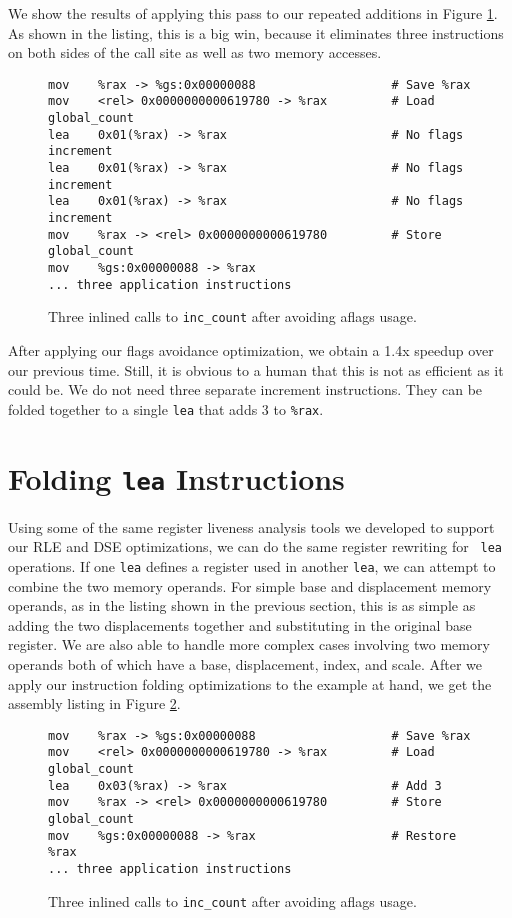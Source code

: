 We show the results of applying this pass to our repeated additions in Figure
\ref{fig:inscount_flags}.  As shown in the listing, this is a big win, because
it eliminates three instructions on both sides of the call site as well as two
memory accesses.

\begin{figure}
\begin{verbatim}
mov    %rax -> %gs:0x00000088                   # Save %rax
mov    <rel> 0x0000000000619780 -> %rax         # Load global_count
lea    0x01(%rax) -> %rax                       # No flags increment
lea    0x01(%rax) -> %rax                       # No flags increment
lea    0x01(%rax) -> %rax                       # No flags increment
mov    %rax -> <rel> 0x0000000000619780         # Store global_count
mov    %gs:0x00000088 -> %rax 
... three application instructions
\end{verbatim}
\caption{Three inlined calls to {\tt inc\_count} after avoiding aflags usage.}
\label{fig:inscount_flags}
\end{figure}

After applying our flags avoidance optimization, we obtain a 1.4x speedup over
our previous time.  Still, it is obvious to a human that this is not as
efficient as it could be.  We do not need three separate increment instructions.
They can be folded together to a single {\tt lea} that adds 3 to {\tt \%rax}.

\section{Folding {\tt lea} Instructions}
\label{sec:fold_lea}

Using some of the same register liveness analysis tools we developed to support
our RLE and DSE optimizations, we can do the same register rewriting for {\tt
lea} operations.  If one {\tt lea} defines a register used in another {\tt lea},
we can attempt to combine the two memory operands.  For simple base and
displacement memory operands, as in the listing shown in the previous section,
this is as simple as adding the two displacements together and substituting in
the original base register.  We are also able to handle more complex cases
involving two memory operands both of which have a base, displacement, index,
and scale.  After we apply our instruction folding optimizations to the example
at hand, we get the assembly listing in Figure \ref{fig:inscount_lea}.

\begin{figure}
\begin{verbatim}
mov    %rax -> %gs:0x00000088                   # Save %rax
mov    <rel> 0x0000000000619780 -> %rax         # Load global_count
lea    0x03(%rax) -> %rax                       # Add 3
mov    %rax -> <rel> 0x0000000000619780         # Store global_count
mov    %gs:0x00000088 -> %rax                   # Restore %rax
... three application instructions
\end{verbatim}
\caption{Three inlined calls to {\tt inc\_count} after avoiding aflags usage.}
\label{fig:inscount_lea}
\end{figure}

